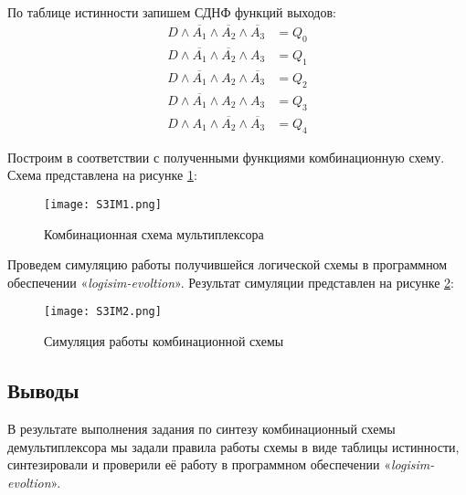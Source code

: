 По таблице истинности запишем СДНФ функций выходов:
\begin{align*}
D\land \overline{A_1} \land\overline{A_2}\land\overline{A_3} &= Q_0 \\
D\land \overline{A_1} \land\overline{A_2}\land A_3 &= Q_1 \\
D\land \overline{A_1} \land A_2\land\overline{A_3} &= Q_2 \\
D\land \overline{A_1} \land A_2\land A_3 &= Q_3 \\
D\land A_1\land \overline{A_2} \land \overline{A_3} &= Q_4
\end{align*}

Построим в соответствии с полученными функциями комбинационную схему. Схема представлена на рисунке \ref{fig:section3:scheme}:

\begin{figure}[ht!]
    \centering
    \texttt{[image: S3IM1.png]}
    \caption{Комбинационная схема мультиплексора}
    \label{fig:section3:scheme}
\end{figure}

Проведем симуляцию работы получившейся логической схемы в программном обеспечении «\textit{logisim-evoltion}»\cite{logisim}. Результат симуляции представлен на рисунке \ref{fig:section3:simulation}:

\begin{figure}[H]
    \centering
    \texttt{[image: S3IM2.png]}
    \caption{Симуляция работы комбинационной схемы}
    \label{fig:section3:simulation}
\end{figure}

\subsection{Выводы}
В результате выполнения задания по синтезу комбинационный схемы
демультиплексора мы задали правила работы схемы в виде таблицы истинности, синтезировали и проверили её работу в программном обеспечении «\textit{logisim-evoltion}».
